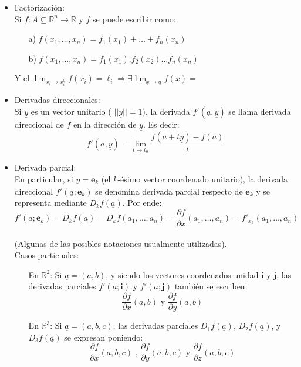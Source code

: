 \documentclass[a4paper, 12pt]{article}
\begin{document}
\begin{itemize}
\item Factorización: \\
Si $f: A\subseteq \mathbb{R}^n \to \mathbb{R}$ y $f$ se puede escribir como:
\begin{itemize}
\item[a)] $f(x_1,\dots,x_n) = f_1(x_1) + \dots +f_n(x_n)$
\item[b)] $f(x_1,\dots,x_n) = f_1(x_1).f_2(x_2) \dots f_n(x_n)$
\end{itemize}
Y el $\displaystyle \lim_{x_i \to x_{i}^0} f(x_i) = \ell_i \Longrightarrow \exists \lim_{\underline{x} \to \underline{a}} f(x) =$

\item Derivadas direccionales: \\
Si $\underline{y}$ es un vector unitario ( $||\underline{y}||=1$), la derivada $f'(\underline{a},\underline{y})$ se llama derivada direccional de $f$ en la dirección de $\underline{y}$. Es decir: \\
$$ f'(\underline{a},\underline{y})=\lim_{t \to t_0} \frac{f(\underline{a} + t\underline{y}) - f(\underline{a})}{t}$$

\item Derivada parcial: \\
En particular, si $\underline{y}=\mathbf{e}_k$ (el $k$-ésimo vector coordenado unitario), la derivada direccional $f'(\underline{a};\mathbf{e}_k)$ se denomina derivada parcial respecto de $\mathbf{e}_k$ y se representa mediante $D_kf(\underline{a})$. Por ende:
$$f'(\underline{a};\mathbf{e}_k) = D_kf(\underline{a})= D_kf(a_1,\dots,a_n) = \dfrac{\partial f}{\partial x}(a_1,\dots, a_n) = f'_{x_k}(a_1,\dots,a_n)$$ \\[-8pt]
(Algunas de las posibles notaciones usualmente utilizadas). \\
Casos particuales:
\begin{itemize}
\item[En $\mathbb{R}^2$:] Si $\underline{a}=(a,b)$, y siendo los vectores coordenados unidad $\mathbf{i}$ y $\mathbf{j}$, las derivadas parciales $f'(\underline{a};\mathbf{i})$ y $f'(\underline{a};\mathbf{j})$ también se escriben: \\
$$\dfrac{\partial f}{\partial x} (a,b) \text{ y }\dfrac{\partial f}{\partial y} (a,b)$$
\item[En $\mathbb{R}^3$:] Si $\underline{a}=(a,b,c)$, las derivadas parciales $D_1f(\underline{a})$, $D_2f(\underline{a})$, y $D_3f(\underline{a})$ se expresan poniendo: \\     
$$\dfrac{\partial f}{\partial x} (a,b,c) \text{ , }\dfrac{\partial f}{\partial y} (a,b,c) \text{ y }\dfrac{\partial f}{\partial z} (a,b,c)$$
\end{itemize}


\end{itemize}
\end{document}
